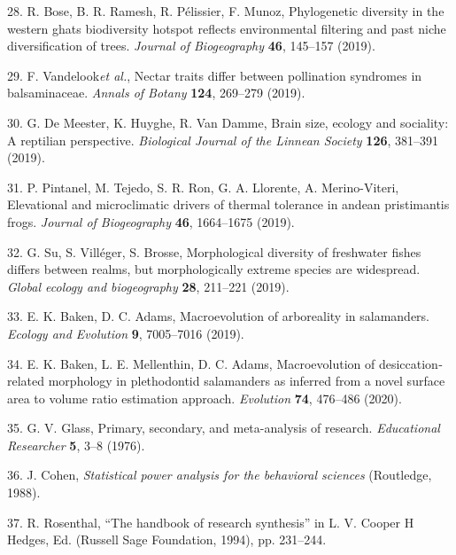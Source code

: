 \documentclass[
]{article}
\begin{document}
\leavevmode\hypertarget{ref-Bose2019}{}%
28. R. Bose, B. R. Ramesh, R. Pélissier, F. Munoz, Phylogenetic
diversity in the western ghats biodiversity hotspot reflects
environmental filtering and past niche diversification of trees.
\emph{Journal of Biogeography} \textbf{46}, 145--157 (2019).

\leavevmode\hypertarget{ref-Vandelook2019}{}%
29. F. Vandelook\emph{et al.}, Nectar traits differ between pollination
syndromes in balsaminaceae. \emph{Annals of Botany} \textbf{124},
269--279 (2019).

\leavevmode\hypertarget{ref-DeMeester2019}{}%
30. G. De Meester, K. Huyghe, R. Van Damme, Brain size, ecology and
sociality: A reptilian perspective. \emph{Biological Journal of the
Linnean Society} \textbf{126}, 381--391 (2019).

\leavevmode\hypertarget{ref-Pintanel2019}{}%
31. P. Pintanel, M. Tejedo, S. R. Ron, G. A. Llorente, A. Merino-Viteri,
Elevational and microclimatic drivers of thermal tolerance in andean
pristimantis frogs. \emph{Journal of Biogeography} \textbf{46},
1664--1675 (2019).

\leavevmode\hypertarget{ref-Su2019}{}%
32. G. Su, S. Villéger, S. Brosse, Morphological diversity of freshwater
fishes differs between realms, but morphologically extreme species are
widespread. \emph{Global ecology and biogeography} \textbf{28}, 211--221
(2019).

\leavevmode\hypertarget{ref-Baken2019}{}%
33. E. K. Baken, D. C. Adams, Macroevolution of arboreality in
salamanders. \emph{Ecology and Evolution} \textbf{9}, 7005--7016 (2019).

\leavevmode\hypertarget{ref-Baken2020}{}%
34. E. K. Baken, L. E. Mellenthin, D. C. Adams, Macroevolution of
desiccation‐related morphology in plethodontid salamanders as inferred
from a novel surface area to volume ratio estimation approach.
\emph{Evolution} \textbf{74}, 476--486 (2020).

\leavevmode\hypertarget{ref-Glass1976}{}%
35. G. V. Glass, Primary, secondary, and meta-analysis of research.
\emph{Educational Researcher} \textbf{5}, 3--8 (1976).

\leavevmode\hypertarget{ref-Cohen1988}{}%
36. J. Cohen, \emph{Statistical power analysis for the behavioral
sciences} (Routledge, 1988).

\leavevmode\hypertarget{ref-Rosenthal1994}{}%
37. R. Rosenthal, ``The handbook of research synthesis'' in L. V. Cooper
H Hedges, Ed. (Russell Sage Foundation, 1994), pp. 231--244.
\end{document}
